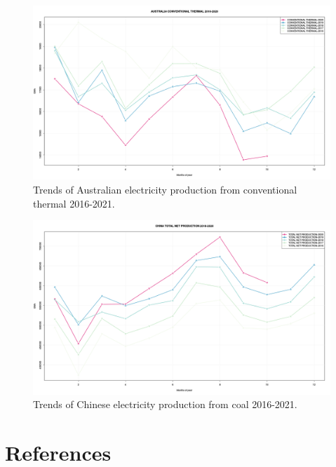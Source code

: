 \documentclass[final,3p,times,authoryear]{elsarticle}
\begin{document}
\begin{figure}
\centering
\includegraphics[width=.99\linewidth]{images/AUSTRALIACONVENTIONALTHERMAL.png}
\caption{Trends of Australian electricity production from conventional thermal 2016-2021.}
 \label{fig:au-thermal}
\end{figure}

\begin{figure}
\centering
\includegraphics[width=.99\linewidth]{images/CHINATOTALNETPRODUCTION.png}
\caption{Trends of Chinese electricity production from coal 2016-2021.}
 \label{fig:china-net}
\end{figure}


\section*{References}\label{sec:ref}

   
   
\end{document}
